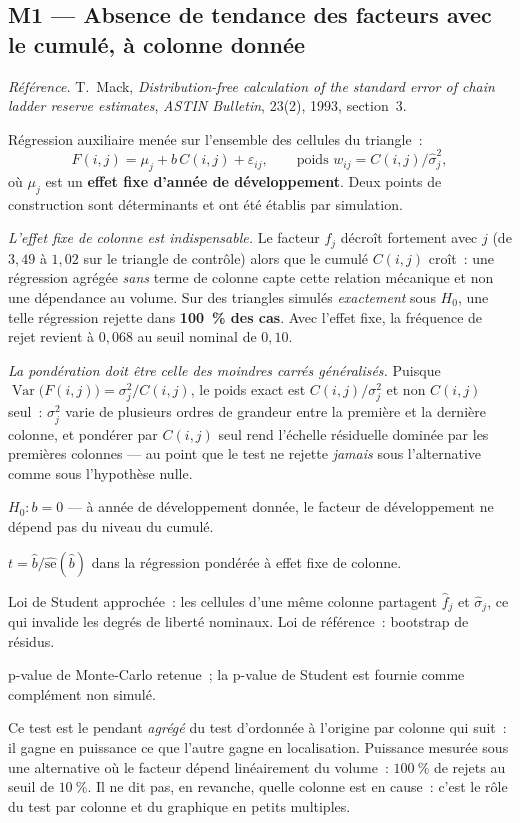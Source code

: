 \documentclass[a4paper,11pt]{article}
\newcommand{\refl}[1]{{\small\textcolor{maincolor!70!black}{\textit{Référence.} #1}}\par\smallskip}
\newcounter{ficheid}
\newenvironment{fiche}[1]{%
  \stepcounter{ficheid}%
  \phantomsection
  \subsection{#1}%
  \label{fiche:\theficheid}%
}{%
  \end{description}\vspace{0.5em}%
}
\newcommand{\Cadre}{%
  \begin{description}[leftmargin=0pt, style=unboxed, itemsep=3pt, topsep=3pt, parsep=2pt]%
  \item[\textcolor{financeblue}{\textbf{1. Cadre, notations et hypothèses de validité (non testées).}}]}
\newcommand{\Hzero}{\item[\textcolor{financeblue}{\textbf{2. Hypothèse nulle.}}]}
\newcommand{\Stat}{\item[\textcolor{financeblue}{\textbf{3. Statistique de test.}}]}
\newcommand{\Loi}{\item[\textcolor{financeblue}{\textbf{4. Loi sous $H_0$.}}]}
\newcommand{\Pval}{\item[\textcolor{financeblue}{\textbf{5. p-value.}}]}
\newcommand{\Usage}{\item[\textcolor{financeblue}{\textbf{6. Usage et limites.}}]}
\begin{document}
\begin{fiche}{M1 --- Absence de tendance des facteurs avec le cumulé, à colonne donnée}
\label{mw:m1}
\refl{T.~Mack, \emph{Distribution-free calculation of the standard error of chain
ladder reserve estimates}, \emph{ASTIN Bulletin}, 23(2), 1993, section~3.}
\Cadre
Régression auxiliaire menée sur l'ensemble des cellules du triangle~:
\[
  F(i,j) = \mu_j + b\,C(i,j) + \varepsilon_{ij},
  \qquad \text{poids } w_{ij} = C(i,j)/\hat\sigma_j^2 ,
\]
où $\mu_j$ est un \textbf{effet fixe d'année de développement}. Deux points de
construction sont déterminants et ont été établis par simulation.

\emph{L'effet fixe de colonne est indispensable.} Le facteur $f_j$ décroît
fortement avec $j$ (de $3{,}49$ à $1{,}02$ sur le triangle de contrôle) alors que
le cumulé $C(i,j)$ croît~: une régression agrégée \emph{sans} terme de colonne
capte cette relation mécanique et non une dépendance au volume. Sur des triangles
simulés \emph{exactement} sous $H_0$, une telle régression rejette dans
\textbf{100~\% des cas}. Avec l'effet fixe, la fréquence de rejet revient à
$0{,}068$ au seuil nominal de $0{,}10$.

\emph{La pondération doit être celle des moindres carrés généralisés.} Puisque
$\operatorname{Var}\big(F(i,j)\big) = \sigma_j^2/C(i,j)$, le poids exact est
$C(i,j)/\sigma_j^2$ et non $C(i,j)$ seul~: $\sigma_j^2$ varie de plusieurs ordres
de grandeur entre la première et la dernière colonne, et pondérer par $C(i,j)$
seul rend l'échelle résiduelle dominée par les premières colonnes --- au point
que le test ne rejette \emph{jamais} sous l'alternative comme sous l'hypothèse
nulle.
\Hzero
$H_0 : b = 0$ --- à année de développement donnée, le facteur de développement ne
dépend pas du niveau du cumulé.
\Stat
$t = \hat b / \widehat{\mathrm{se}}(\hat b)$ dans la régression pondérée à effet
fixe de colonne.
\Loi
Loi de Student approchée~: les cellules d'une même colonne partagent $\hat f_j$
et $\hat\sigma_j$, ce qui invalide les degrés de liberté nominaux. Loi de
référence~: bootstrap de résidus.
\Pval
p-value de Monte-Carlo retenue~; la p-value de Student est fournie comme
complément non simulé.
\Usage
Ce test est le pendant \emph{agrégé} du test d'ordonnée à l'origine par colonne
qui suit~: il gagne en puissance ce que l'autre gagne en localisation. Puissance
mesurée sous une alternative où le facteur dépend linéairement du volume~:
$100~\%$ de rejets au seuil de $10~\%$. Il ne dit pas, en revanche, quelle
colonne est en cause~: c'est le rôle du test par colonne et du graphique en
petits multiples.
\end{fiche}
\end{document}
